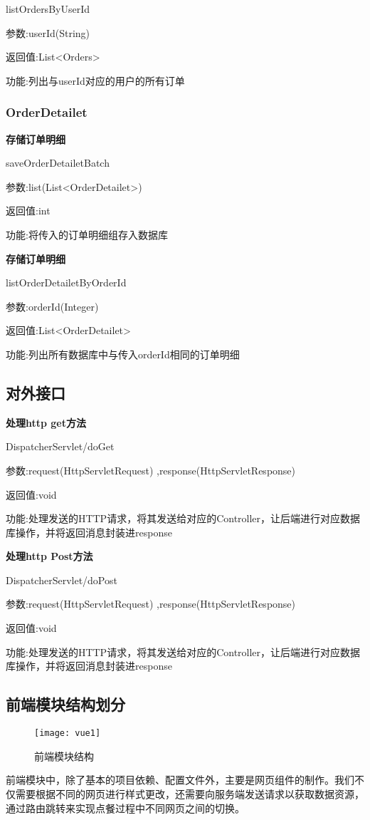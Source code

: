 listOrdersByUserId

参数:userId(String)

返回值:List<Orders>

功能:列出与userId对应的用户的所有订单

\subsubsection{OrderDetailet}

\textbf{存储订单明细}

saveOrderDetailetBatch

参数:list(List<OrderDetailet>)

返回值:int

功能:将传入的订单明细组存入数据库

\textbf{存储订单明细}

listOrderDetailetByOrderId

参数:orderId(Integer)

返回值:List<OrderDetailet>

功能:列出所有数据库中与传入orderId相同的订单明细

\subsection{对外接口}
\textbf{处理http get方法}

DispatcherServlet/doGet

参数:request(HttpServletRequest) ,response(HttpServletResponse)

返回值:void

功能:处理发送的HTTP请求，将其发送给对应的Controller，让后端进行对应数据库操作，并将返回消息封装进response

\textbf{处理http Post方法}

DispatcherServlet/doPost

参数:request(HttpServletRequest) ,response(HttpServletResponse)

返回值:void

功能:处理发送的HTTP请求，将其发送给对应的Controller，让后端进行对应数据库操作，并将返回消息封装进response
\subsection{前端模块结构划分}
\begin{figure}[htbp]
    \centering
    \texttt{[image: vue1]}
    \caption{前端模块结构}\label{fig:vue1}
\end{figure}
前端模块中，除了基本的项目依赖、配置文件外，主要是网页组件的制作。我们不仅需要根据不同的网页进行样式更改，还需要向服务端发送请求以获取数据资源，通过路由跳转来实现点餐过程中不同网页之间的切换。

